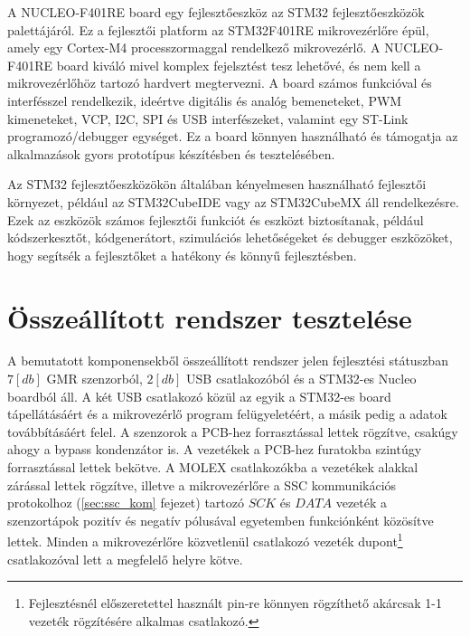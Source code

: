 A NUCLEO-F401RE board egy fejlesztőeszköz az STM32 fejlesztőeszközök palettájáról. Ez a fejlesztői platform az STM32F401RE mikrovezérlőre épül, amely egy Cortex-M4 processzormaggal rendelkező mikrovezérlő. A NUCLEO-F401RE board kiváló mivel komplex fejelsztést tesz lehetővé, és nem kell a mikrovezérlőhöz tartozó hardvert megtervezni. A board számos funkcióval és interfésszel rendelkezik, ideértve digitális és analóg bemeneteket, PWM kimeneteket, VCP, I2C, SPI és USB interfészeket, valamint egy ST-Link programozó/debugger egységet. Ez a board könnyen használható és támogatja az alkalmazások gyors prototípus készítésben és tesztelésében.\cite{stm32doku}

Az STM32 fejlesztőeszközökön általában kényelmesen használható fejlesztői környezet, például az STM32CubeIDE vagy az STM32CubeMX áll rendelkezésre. Ezek az eszközök számos fejlesztői funkciót és eszközt biztosítanak, például kódszerkesztőt, kódgenerátort, szimulációs lehetőségeket és debugger eszközöket, hogy segítsék a fejlesztőket a hatékony és könnyű fejlesztésben.\cite{stm32doku}

\newpage
\section{Összeállított rendszer tesztelése}

A bemutatott komponensekből összeállított rendszer jelen fejlesztési státuszban $7[db]$ GMR szenzorból, $2[db]$ USB csatlakozóból és a STM32-es Nucleo boardból áll. A két USB csatlakozó közül az egyik a STM32-es board tápellátásáért és a mikrovezérlő program felügyeletéért, a másik pedig a adatok továbbításáért felel. A szenzorok a PCB-hez forrasztással lettek rögzítve, csakúgy ahogy a bypass kondenzátor is. A vezetékek a PCB-hez furatokba szintúgy forrasztással lettek bekötve. A MOLEX csatlakozókba a vezetékek alakkal zárással lettek rögzítve, illetve a mikrovezérlőre a SSC kommunikációs protokolhoz (\ref{sec:ssc_kom} fejezet) tartozó $SCK$ és $DATA$ vezeték a szenzortápok pozitív és negatív pólusával egyetemben funkciónként közösítve lettek. Minden a mikrovezérlőre közvetlenül csatlakozó vezeték dupont\footnote{Fejlesztésnél előszeretettel használt pin-re könnyen rögzíthető akárcsak 1-1 vezeték rögzítésére alkalmas csatlakozó.} csatlakozóval lett a megfelelő helyre kötve.

